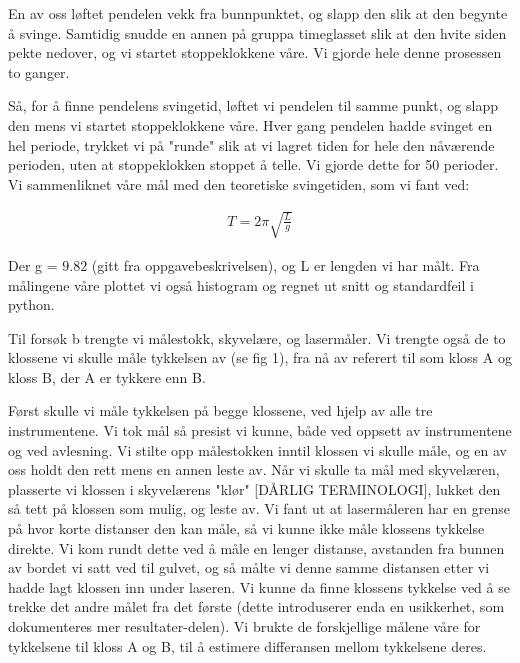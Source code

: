En av oss løftet pendelen vekk fra bunnpunktet, og slapp den slik at den begynte å svinge. Samtidig snudde en annen på gruppa timeglasset slik at den hvite siden pekte nedover, og vi startet stoppeklokkene våre. Vi gjorde hele denne prosessen to ganger.

Så, for å finne pendelens svingetid, løftet vi pendelen til samme punkt, og slapp den mens vi startet stoppeklokkene våre. Hver gang pendelen hadde svinget en hel periode, trykket vi på "runde" slik at vi lagret tiden for hele den nåværende perioden, uten at stoppeklokken stoppet å telle. Vi gjorde dette for 50 perioder. Vi sammenliknet våre mål med den teoretiske svingetiden, som vi fant ved:

\begin{align}
    T =2\pi\sqrt{\frac{L}{g}}\label{TFormula}
\end{align}

Der g = $9.82$ (gitt fra oppgavebeskrivelsen), og L er lengden vi har målt. Fra målingene våre plottet vi også histogram og regnet ut snitt og standardfeil i python.
\bigskip


Til forsøk b trengte vi målestokk, skyvelære, og lasermåler. Vi trengte også de to klossene vi skulle måle tykkelsen av (se fig 1), fra nå av referert til som kloss A og kloss B, der A er tykkere enn B.

Først skulle vi måle tykkelsen på begge klossene, ved hjelp av alle tre instrumentene. Vi tok mål så presist vi kunne, både ved oppsett av instrumentene og ved avlesning. Vi stilte opp målestokken inntil klossen vi skulle måle, og en av oss holdt den rett mens en annen leste av. Når vi skulle ta mål med skyvelæren, plasserte vi klossen i skyvelærens "klør" [DÅRLIG TERMINOLOGI], lukket den så tett på klossen som mulig, og leste av. Vi fant ut at lasermåleren har en grense på hvor korte distanser den kan måle, så vi kunne ikke måle klossens tykkelse direkte. Vi kom rundt dette ved å måle en lenger distanse, avstanden fra bunnen av bordet vi satt ved til gulvet, og så målte vi denne samme distansen etter vi hadde lagt klossen inn under laseren. Vi kunne da finne klossens tykkelse ved å se trekke det andre målet fra det første (dette introduserer enda en usikkerhet, som dokumenteres mer resultater-delen). Vi brukte de forskjellige målene våre for tykkelsene til kloss A og B, til å estimere differansen mellom tykkelsene deres.

